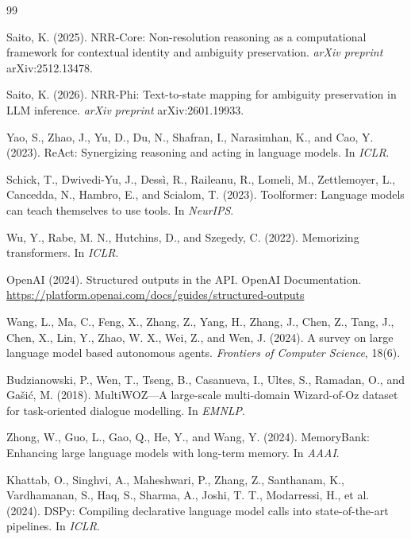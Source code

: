 \documentclass[11pt,a4paper]{article}
\begin{document}
\begin{thebibliography}{99}

Saito, K. (2025).
NRR-Core: Non-resolution reasoning as a computational framework
for contextual identity and ambiguity preservation.
\textit{arXiv preprint} arXiv:2512.13478.

Saito, K. (2026).
NRR-Phi: Text-to-state mapping for ambiguity preservation in LLM inference.
\textit{arXiv preprint} arXiv:2601.19933.

Yao, S., Zhao, J., Yu, D., Du, N., Shafran, I., Narasimhan, K., and Cao, Y. (2023).
ReAct: Synergizing reasoning and acting in language models.
In \textit{ICLR}.

Schick, T., Dwivedi-Yu, J., Dess\`i, R., Raileanu, R., Lomeli, M., Zettlemoyer, L.,
Cancedda, N., Hambro, E., and Scialom, T. (2023).
Toolformer: Language models can teach themselves to use tools.
In \textit{NeurIPS}.

Wu, Y., Rabe, M. N., Hutchins, D., and Szegedy, C. (2022).
Memorizing transformers.
In \textit{ICLR}.

OpenAI (2024).
Structured outputs in the API.
OpenAI Documentation.
\url{https://platform.openai.com/docs/guides/structured-outputs}

Wang, L., Ma, C., Feng, X., Zhang, Z., Yang, H., Zhang, J., Chen, Z., Tang, J.,
Chen, X., Lin, Y., Zhao, W. X., Wei, Z., and Wen, J. (2024).
A survey on large language model based autonomous agents.
\textit{Frontiers of Computer Science}, 18(6).

Budzianowski, P., Wen, T., Tseng, B., Casanueva, I., Ultes, S., Ramadan, O.,
and Ga\v{s}i\'{c}, M. (2018).
MultiWOZ---A large-scale multi-domain Wizard-of-Oz dataset for
task-oriented dialogue modelling.
In \textit{EMNLP}.

Zhong, W., Guo, L., Gao, Q., He, Y., and Wang, Y. (2024).
MemoryBank: Enhancing large language models with long-term memory.
In \textit{AAAI}.

Khattab, O., Singhvi, A., Maheshwari, P., Zhang, Z., Santhanam, K., Vardhamanan, S.,
Haq, S., Sharma, A., Joshi, T. T., Modarressi, H., et al. (2024).
DSPy: Compiling declarative language model calls into state-of-the-art
pipelines.
In \textit{ICLR}.

\end{thebibliography}
\end{document}
